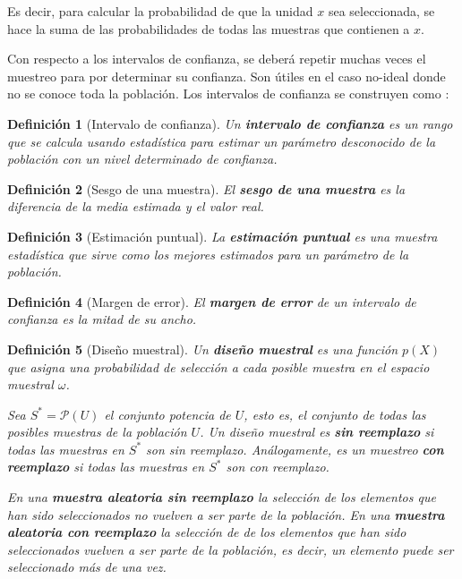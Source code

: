 \documentclass{report}
\newtheorem{definition}{Definición}
\begin{document}
\bigbreak

Es decir, para calcular la probabilidad de que la unidad $x$ sea seleccionada, se hace la suma de las probabilidades de todas las muestras que contienen a $x$.

\bigbreak

Con respecto a los intervalos de confianza, se deberá repetir muchas veces el muestreo para por determinar su confianza. Son útiles en el caso no-ideal donde no se conoce toda la población. Los intervalos de confianza se construyen como \cite{the-pennsylvania-state-university-no-date}:

\begin{definition}[Intervalo de confianza]
    Un \textbf{intervalo de confianza} es un rango que se calcula usando estadística para estimar un parámetro desconocido de la población con un nivel determinado de confianza.
\end{definition}

\bigbreak

\begin{definition}[Sesgo de una muestra]
    El \textbf{sesgo de una muestra} es la diferencia de la media estimada y el valor real.
\end{definition}

\bigbreak

\begin{definition}[Estimación puntual]
    La \textbf{estimación puntual} es una muestra estadística que sirve como los mejores estimados para un parámetro de la población.
\end{definition}

\bigbreak

\begin{definition}[Margen de error]
    El \textbf{margen de error} de un intervalo de confianza es la mitad de su ancho.
\end{definition}

\bigbreak

\begin{definition}[Diseño muestral]
    Un \textbf{diseño muestral} es una función $p(X)$ que asigna una probabilidad de selección a cada posible muestra en el espacio muestral $\omega$.
    
    \bigbreak
    
    Sea $S^* = \mathcal{P}(U)$ el conjunto potencia de $U$, esto es, el conjunto de todas las posibles muestras de la población $U$. Un diseño muestral es \textbf{sin reemplazo} si todas las muestras en $S^*$ son sin reemplazo. Análogamente, es un muestreo \textbf{con reemplazo} si todas las muestras en $S^*$ son con reemplazo.

    \bigbreak
    
    En una \textbf{muestra aleatoria sin reemplazo} la selección de los elementos que han sido seleccionados no vuelven a ser parte de la población. En una \textbf{muestra aleatoria con reemplazo} la selección de de los elementos que han sido seleccionados vuelven a ser parte de la población, es decir, un elemento puede ser seleccionado más de una vez.
\end{definition}
\end{document}
